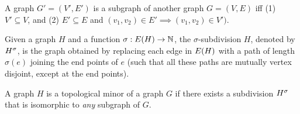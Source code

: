 \documentclass[11pt]{article}
\begin{document}
\begin{definition}\label{def:dep-graphs}
	
\end{definition}




\begin{definition}[Subgraph]\label{def:subgraph}
A graph $G'=(V', E')$ is a subgraph of another graph $G=(V, E)$ iff (1) $V'\subseteq V$, and (2) $E'\subseteq E$ and  $(v_1, v_2) \in E' \implies (v_1, v_2) \in V')$.
	
\end{definition}

\begin{definition}\label{def:subdivisions}
Given a graph $H$ and a function $\sigma: E(H) \rightarrow \mathbb{N}$, the $\sigma$-subdivision $H$, denoted by ${H}^{\sigma}$, is the graph obtained by replacing each edge in $E(H)$ with a path of length $\sigma(e)$ joining the end points of $e$ (such that all these paths are mutually vertex disjoint, except at the end points).	
\end{definition}

\begin{definition}\label{def:topological-minor}
A graph $H$ is a topological minor of a graph $G$ if there exists a subdivision ${H}^{\sigma}$ that is isomorphic to \emph{any} subgraph of $G$.	
\end{definition}
\end{document}
